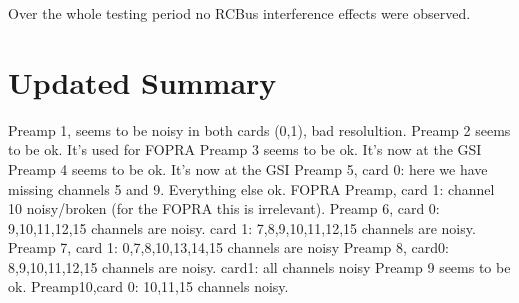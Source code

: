 \documentclass{report}
\begin{document}
Over the whole testing period no RCBus interference effects were observed.


\section{Updated Summary}
Preamp 1, seems to be noisy in both cards (0,1), bad resolultion.\newline
Preamp 2 seems to be ok. It's used for FOPRA\newline
Preamp 3 seems to be ok. It's now at the GSI\newline
Preamp 4 seems to be ok. It's now at the GSI\newline
Preamp 5, card 0: here we have missing channels 5 and 9. Everything else ok.\newline
FOPRA Preamp, card 1: channel 10 noisy/broken (for the FOPRA this is irrelevant).\newline
Preamp 6, card 0: 9,10,11,12,15 channels are noisy. card 1: 7,8,9,10,11,12,15 channels are noisy.\newline
Preamp 7, card 1: 0,7,8,10,13,14,15 channels are noisy\newline
Preamp 8, card0: 8,9,10,11,12,15 channels are noisy. card1: all channels noisy\newline
Preamp 9 seems to be ok.\newline
Preamp10,card 0: 10,11,15 channels noisy.\newline
\end{document}
